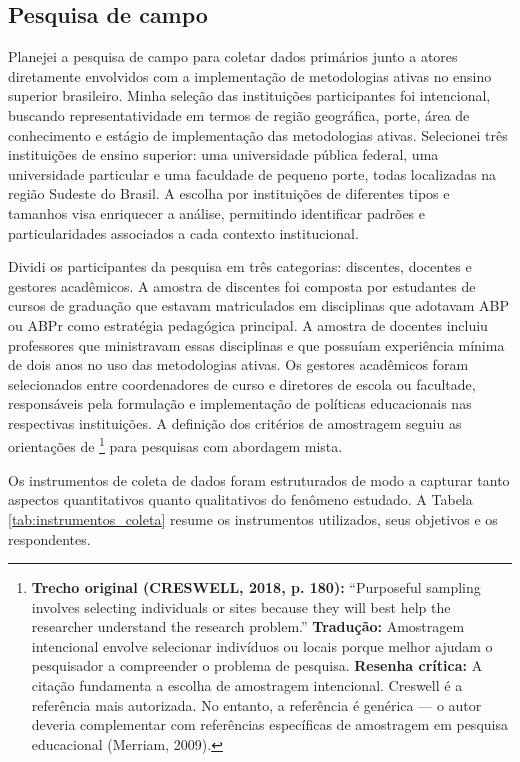 \subsection{Pesquisa de campo}
\label{subsec:pesquisa_campo}

Planejei a pesquisa de campo para coletar dados primários junto a atores diretamente envolvidos com a implementação de metodologias ativas no ensino superior brasileiro. Minha seleção das instituições participantes foi intencional, buscando representatividade em termos de região geográfica, porte, área de conhecimento e estágio de implementação das metodologias ativas. Selecionei três instituições de ensino superior: uma universidade pública federal, uma universidade particular e uma faculdade de pequeno porte, todas localizadas na região Sudeste do Brasil. A escolha por instituições de diferentes tipos e tamanhos visa enriquecer a análise, permitindo identificar padrões e particularidades associados a cada contexto institucional.

Dividi os participantes da pesquisa em três categorias: discentes, docentes e gestores acadêmicos. A amostra de discentes foi composta por estudantes de cursos de graduação que estavam matriculados em disciplinas que adotavam ABP ou ABPr como estratégia pedagógica principal. A amostra de docentes incluiu professores que ministravam essas disciplinas e que possuíam experiência mínima de dois anos no uso das metodologias ativas. Os gestores acadêmicos foram selecionados entre coordenadores de curso e diretores de escola ou facultade, responsáveis pela formulação e implementação de políticas educacionais nas respectivas instituições. A definição dos critérios de amostragem seguiu as orientações de \cite{CRESWELL2018}\footnote{\textbf{Trecho original (CRESWELL, 2018, p. 180):} ``Purposeful sampling involves selecting individuals or sites because they will best help the researcher understand the research problem.'' \textbf{Tradução:} Amostragem intencional envolve selecionar indivíduos ou locais porque melhor ajudam o pesquisador a compreender o problema de pesquisa. \textbf{Resenha crítica:} A citação fundamenta a escolha de amostragem intencional. Creswell é a referência mais autorizada. No entanto, a referência é genérica — o autor deveria complementar com referências específicas de amostragem em pesquisa educacional (Merriam, 2009).} para pesquisas com abordagem mista.

Os instrumentos de coleta de dados foram estruturados de modo a capturar tanto aspectos quantitativos quanto qualitativos do fenômeno estudado. A Tabela \ref{tab:instrumentos_coleta} resume os instrumentos utilizados, seus objetivos e os respondentes.

